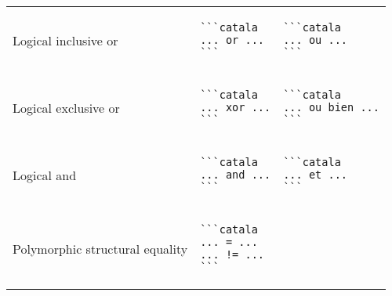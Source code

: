 \documentclass[a3paper,landscape]{article}
\begin{document}
\begin{multicols*}{2}
\begin{center}
\begin{tabular}{p{}p{}p{}}
      \\
      Logical inclusive or            &
      \vspace*{-1.75em}
      \begin{verbatim}
```catala
... or ...
```
\end{verbatim}
      \vspace*{-1.75em}
                                      &
      \vspace*{-1.75em}
      \begin{verbatim}
```catala
... ou ...
```
\end{verbatim}
      \vspace*{-1.75em}
      \\
      Logical exclusive or            &
      \vspace*{-1.75em}
      \begin{verbatim}
```catala
... xor ...
```
\end{verbatim}
      \vspace*{-1.75em}
                                      &
      \vspace*{-1.75em}
      \begin{verbatim}
```catala
... ou bien ...
```
\end{verbatim}
      \vspace*{-1.75em}
      \\
      Logical and                     &
      \vspace*{-1.75em}
      \begin{verbatim}
```catala
... and ...
```
\end{verbatim}
      \vspace*{-1.75em}
                                      &
      \vspace*{-1.75em}
      \begin{verbatim}
```catala
... et ...
```
\end{verbatim}
      \vspace*{-1.75em}
      \\
      Polymorphic structural equality &
      \vspace*{-1.75em}
      \begin{verbatim}
```catala
... = ...
... != ...
```
\end{verbatim}
      \vspace*{-1.75em}
                                      &
      \vspace*{-1.75em}
      \begin{verbatim}

\end{verbatim}
\end{tabular}
\end{center}
\end{multicols*}
\end{document}
